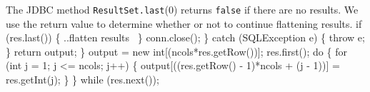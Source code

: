 \documentclass{article}
\def\nwendcode{\endtrivlist \endgroup}      %
\let\nwdocspar=\par
\theoremstyle{definition}                   %
\begin{document}
{\small The JDBC method {\tt{}ResultSet.last}(0) returns {\tt{}false} if there are no
results.  We use the return value to determine whether or not to continue
flattening results.}
\nwenddocs{}\plusendmoddef
    if (res.last()) \{
      \LA{}..flatten results~{\nwtagstyle{}}\RA{}
    \}
    conn.close();
  \} catch (SQLException e) \{
    throw e;
  \}
  return output;
\}
\eatline
{}\nwendcode{}
\nwenddocs{}\endmoddef{}
output = new int[(ncols*res.getRow())];
res.first();
do \{
  for (int j = 1; j <= ncols; j++) \{
    output[((res.getRow() - 1)*ncols + (j - 1))] = res.getInt(j);
  \}
\} while (res.next());
\nwendcode{}\nwdocspar
\end{document}

